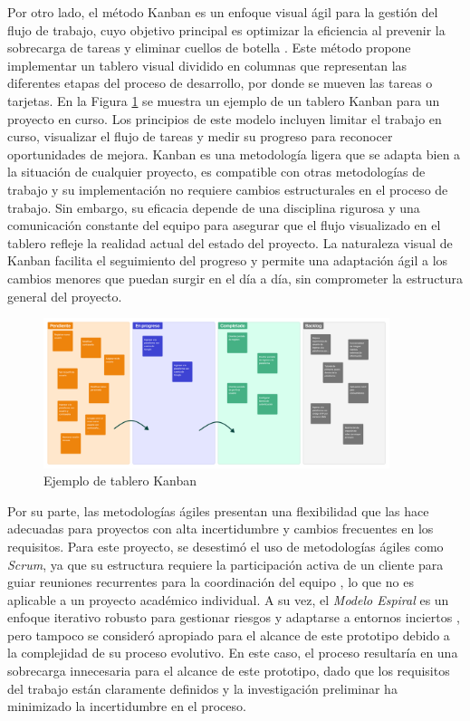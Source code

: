 Por otro lado, el método Kanban es un enfoque visual ágil para la gestión del flujo de trabajo, cuyo objetivo principal es optimizar la eficiencia al prevenir la sobrecarga de tareas y eliminar cuellos de botella \cite{alaidaros2021kanban}. Este método propone implementar un tablero visual dividido en columnas que representan las diferentes etapas del proceso de desarrollo, por donde se mueven las tareas o tarjetas. En la Figura \ref{fig:kanban-board} se muestra un ejemplo de un tablero Kanban para un proyecto en curso. Los principios de este modelo incluyen limitar el trabajo en curso, visualizar el flujo de tareas y medir su progreso para reconocer oportunidades de mejora. Kanban es una metodología ligera que se adapta bien a la situación de cualquier proyecto, es compatible con otras metodologías de trabajo y su implementación no requiere cambios estructurales en el proceso de trabajo. Sin embargo, su eficacia depende de una disciplina rigurosa y una comunicación constante del equipo para asegurar que el flujo visualizado en el tablero refleje la realidad actual del estado del proyecto. La naturaleza visual de Kanban facilita el seguimiento del progreso y permite una adaptación ágil a los cambios menores que puedan surgir en el día a día, sin comprometer la estructura general del proyecto.

\begin{figure}[!htb]
    \centering
    \includegraphics[width=0.9\textwidth]{Figures/model-kanban.png}
    \caption[Tablero Kanban]{Ejemplo de tablero Kanban}
    \label{fig:kanban-board}
\end{figure}

Por su parte, las metodologías ágiles presentan una flexibilidad que las hace adecuadas para proyectos con alta incertidumbre y cambios frecuentes en los requisitos. Para este proyecto, se desestimó el uso de metodologías ágiles como \textit{Scrum}, ya que su estructura requiere la participación activa de un cliente para guiar reuniones recurrentes para la coordinación del equipo \cite{pressman2010ingenieria}, lo que no es aplicable a un proyecto académico individual. A su vez, el \textit{Modelo Espiral} es un enfoque iterativo robusto para gestionar riesgos y adaptarse a entornos inciertos \cite{pressman2010ingenieria}, pero tampoco se consideró apropiado para el alcance de este prototipo debido a la complejidad de su proceso evolutivo. En este caso, el proceso resultaría en una sobrecarga innecesaria para el alcance de este prototipo, dado que los requisitos del trabajo están claramente definidos y la investigación preliminar ha minimizado la incertidumbre en el proceso.

